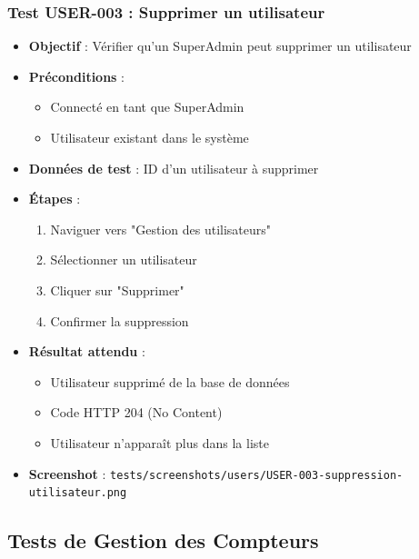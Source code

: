 \subsubsection{Test USER-003 : Supprimer un utilisateur}
\begin{itemize}
    \item \textbf{Objectif} : Vérifier qu'un SuperAdmin peut supprimer un utilisateur
    \item \textbf{Préconditions} : 
        \begin{itemize}
            \item Connecté en tant que SuperAdmin
            \item Utilisateur existant dans le système
        \end{itemize}
    \item \textbf{Données de test} : ID d'un utilisateur à supprimer
    \item \textbf{Étapes} :
        \begin{enumerate}
            \item Naviguer vers "Gestion des utilisateurs"
            \item Sélectionner un utilisateur
            \item Cliquer sur "Supprimer"
            \item Confirmer la suppression
        \end{enumerate}
    \item \textbf{Résultat attendu} : 
        \begin{itemize}
            \item Utilisateur supprimé de la base de données
            \item Code HTTP 204 (No Content)
            \item Utilisateur n'apparaît plus dans la liste
        \end{itemize}
    \item \textbf{Screenshot} : \texttt{tests/screenshots/users/USER-003-suppression-utilisateur.png}
\end{itemize}

\subsection{Tests de Gestion des Compteurs}

